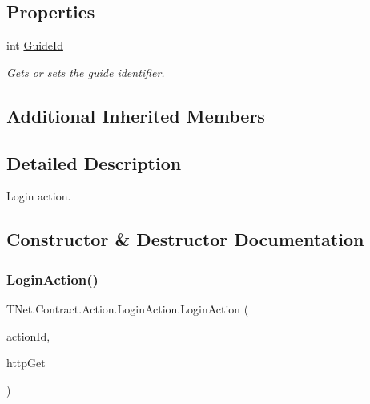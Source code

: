 \subsection*{Properties}
\begin{DoxyCompactItemize}
\item 
int \mbox{\hyperlink{class_t_net_1_1_contract_1_1_action_1_1_login_action_a8a8ce4c73db727db16e6af6635b2ac04}{Guide\+Id}}
\begin{DoxyCompactList}\small\item\em Gets or sets the guide identifier. \end{DoxyCompactList}\end{DoxyCompactItemize}
\subsection*{Additional Inherited Members}


\subsection{Detailed Description}
Login action. 



\subsection{Constructor \& Destructor Documentation}
\mbox{\label{class_t_net_1_1_contract_1_1_action_1_1_login_action_a74b64e33c1265a2ab57ca5f05b05ed9a}} 
\subsubsection{\texorpdfstring{Login\+Action()}{LoginAction()}}
{\footnotesize\ttfamily T\+Net.\+Contract.\+Action.\+Login\+Action.\+Login\+Action (\begin{DoxyParamCaption}\item[{short}]{action\+Id,  }\item[{\mbox{\hyperlink{class_t_net_1_1_service_1_1_action_getter}{Action\+Getter}}}]{http\+Get }\end{DoxyParamCaption})\hspace{0.3cm}{\ttfamily [protected]}}



